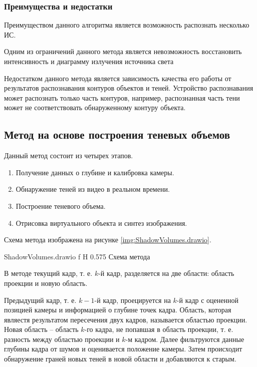 \subsubsection*{Преимущества и недостатки}

Преимуществом данного алгоритма является возможность распознать несколько ИС.

Одним из ограничений данного метода является невозможность восстановить интенсивность и диаграмму излучения источника света

Недостатком данного метода является зависимость качества его работы от результатов распознавания контуров объектов и теней. Устройство распознавания может распознать только часть контуров, например, распознанная часть тени может не соответствовать обнаруженному контуру объекта. 

\subsection{Метод на основе построения теневых объемов}

Данный метод состоит из четырех этапов.

\begin{enumerate}
	\item Получение данных о глубине и калибровка камеры.
	\item Обнаружение теней из видео в реальном времени.
	\item Построение теневого объема.
	\item Отрисовка виртуального объекта и синтез изображения.
\end{enumerate}

Схема метода изображена на рисунке \ref{img:ShadowVolumes.drawio}.

{ShadowVolumes.drawio}
{f}
{H}
{0.575\textwidth}
{Схема метода}

В методе текущий кадр, т. е. $k$-й кадр, разделяется на две области: область проекции и новую область. 

Предыдущий кадр, т. е. $k-1$-й кадр, проецируется на $k$-й кадр с оцененной позицией камеры и информацией о глубине точек кадра. Область, которая являестя результатом пересечения двух кадров, называется областью проекции. Новая область -- область $k$-го кадра, не попавшая в область проекции, т. е. разность между областью проекции и $k$-м кадром. Далее фильтруются данные глубины кадра от шумов и оценивается положение камеры. Затем происходит обнаружение граней новых теней в новой области и добавляются к старым. 

